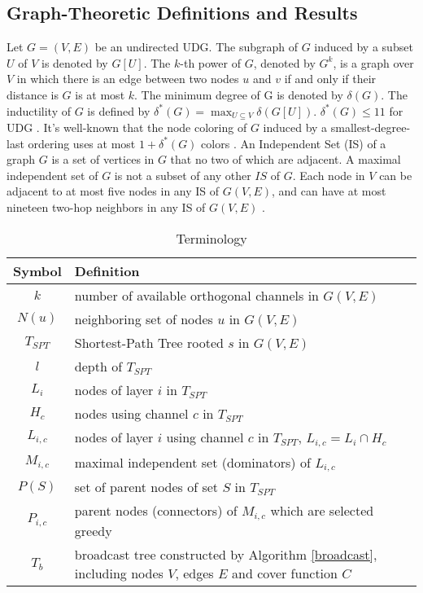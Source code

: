 \documentclass[10pt, conference]{IEEEtran}
\begin{document}
\subsection{Graph-Theoretic Definitions and Results}
Let $G=(V,E)$ be an undirected UDG. The subgraph of $G$ induced
by a subset $U$ of $V$ is denoted by $G[U]$. The $k$-th power
of $G$, denoted by $G^k$, is a graph over $V$ in which there is
an edge between two nodes $u$ and $v$ if and only if their
distance is $G$ is at most $k$. The minimum degree of G is
denoted by $\delta(G)$. The inductility of $G$ is defined by
$\delta^{*}(G) = \max_{U \subseteq V} \delta(G[U])$.
$\delta^{*}(G) \leq 11$ for UDG \cite{info07}. It's well-known
that the node coloring of $G$ induced by a smallest-degree-last
ordering uses at most $1 + \delta^{*}(G)$ colors
\cite{smallest-degree}. An Independent Set (IS) of a graph $G$
is a set of vertices in $G$ that no two of which are adjacent. A
maximal independent set of $G$ is not a subset of any other
$IS$ of $G$. Each node in $V$ can be adjacent to at most five
nodes in any IS of $G(V,E) $\cite{info07}, and can have at most
nineteen two-hop neighbors in any IS of $G(V,E)$ \cite{info09}.





\begin{table}
\caption{Terminology}\label{terminology}
\begin{tabularx}{8.8cm}{c|p{7cm}}
\hline
Symbol & Definition \\
\hline
$k$& number of available orthogonal channels in $G(V,E)$\\
 $N(u)$& neighboring set of nodes $u$ in $G(V,E)$\\
 $T_{SPT}$& Shortest-Path Tree rooted $s$ in $G(V,E)$\\
 $l$& depth of $T_{SPT}$\\
 $L_i$& nodes of layer $i$ in $T_{SPT}$ \\
 $H_c$& nodes using channel $c$ in $T_{SPT}$\\
 $L_{i,c}$& nodes of layer $i$ using channel $c$ in $T_{SPT}$, $L_{i,c} = L_i \cap H_c$\\
 $M_{i,c}$& maximal independent set (dominators) of $L_{i,c}$ \\
 $P(S)$& set of parent nodes of set $S$ in $T_{SPT}$ \\
 $P_{i,c}$& parent nodes (connectors) of $M_{i,c}$ which are selected greedy \\
 $T_b$& broadcast tree constructed by Algorithm \ref{broadcast}, including nodes $V$, edges $E$ and cover function $C$ \\
 \hline
\end{tabularx}
\end{table}
\end{document}
